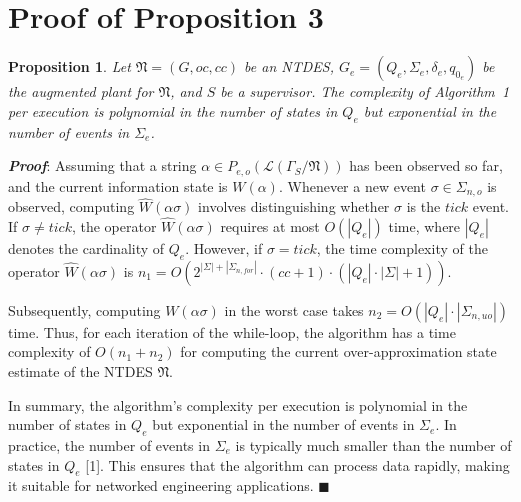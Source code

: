 \documentclass[journal,twocolumn,web]{IEEEtran}
\newtheorem{proposition}{Proposition}
\begin{document}
	 				
	 					
	 				\section{Proof of Proposition 3}	
	 					
	 			\begin{proposition}\label{r3}
	 				Let $\mathfrak{N}=(G,oc,cc)$ be an NTDES, $G_e=(Q_e,\Sigma_e,\delta_e,q_{0_e})$ be the augmented plant for $\mathfrak{N}$, and $S$ be a supervisor. The complexity of Algorithm~1 per execution is polynomial in the number of states in $Q_e$ but exponential in the number of events in $\Sigma_e$.
	 			\end{proposition}
	 			\textbf{\emph{Proof}}: 
	 				Assuming that a string $\alpha\in P_{e,o}(\mathcal{L}(\Gamma_S/\mathfrak{N}))$ has been observed so far, and the current information state is $W(\alpha)$. Whenever a new event $\sigma\in\Sigma_{n,o}$ is observed, computing $\hat{W}(\alpha\sigma)$ involves distinguishing whether $\sigma$ is the $tick$ event. If $\sigma\ne tick$,  the operator $\hat{W}(\alpha\sigma)$ requires at most  $O(|Q_e|)$ time, where $|Q_e|$ denotes the cardinality of $Q_e$. However, if $\sigma= tick$,  the time complexity of the operator $\hat{W}(\alpha\sigma)$ is $n_1=O(2^{|\Sigma|+|\Sigma_{n,for}|}\cdot(cc+1)\cdot(|Q_e|\cdot|\Sigma|+1))$.
	 				
	 				Subsequently, computing $W(\alpha\sigma)$ in the worst case takes $n_2=O(|Q_e|\cdot|\Sigma_{n,uo}|)$ time. Thus, for each iteration of the while-loop, the algorithm has a time complexity of $O(n_1+n_2)$ for computing the current over-approximation state estimate of the NTDES $\mathfrak{N}$. 
	 				
	 				
	 				In summary, the algorithm's complexity per execution is polynomial in the number of states in $Q_e$ but exponential in the number of events in $\Sigma_e$. In practice, the number of events in $\Sigma_e$  is typically much smaller than the number of states in $Q_e$ [1]. This ensures that the algorithm can process data rapidly, making it suitable for networked engineering applications.	\hfill$\blacksquare$
	 		
	 							
	 								
	 								
	 								
	 								
	 									
	 									
	 									
	 										
	 									
	 								
	 				
	 													
	 														
	 														
	 														
	 														
	 														
	 														
	 															
	 															
	 																
	 															
	 
	
	 

	 
	 
		
\end{document}
